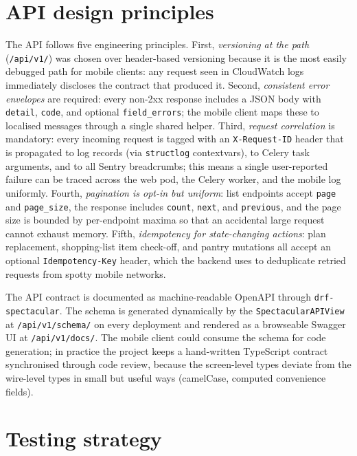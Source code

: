 \section{API design principles}

The API follows five engineering principles. First, \emph{versioning at the path} (\texttt{/api/v1/}) was chosen over header-based versioning because it is the most easily debugged path for mobile clients: any request seen in CloudWatch logs immediately discloses the contract that produced it. Second, \emph{consistent error envelopes} are required: every non-2xx response includes a JSON body with \texttt{detail}, \texttt{code}, and optional \texttt{field\_errors}; the mobile client maps these to localised messages through a single shared helper. Third, \emph{request correlation} is mandatory: every incoming request is tagged with an \texttt{X-Request-ID} header that is propagated to log records (via \texttt{structlog} contextvars), to Celery task arguments, and to all Sentry breadcrumbs; this means a single user-reported failure can be traced across the web pod, the Celery worker, and the mobile log uniformly. Fourth, \emph{pagination is opt-in but uniform}: list endpoints accept \texttt{page} and \texttt{page\_size}, the response includes \texttt{count}, \texttt{next}, and \texttt{previous}, and the page size is bounded by per-endpoint maxima so that an accidental large request cannot exhaust memory. Fifth, \emph{idempotency for state-changing actions}: plan replacement, shopping-list item check-off, and pantry mutations all accept an optional \texttt{Idempotency-Key} header, which the backend uses to deduplicate retried requests from spotty mobile networks.

The API contract is documented as machine-readable OpenAPI through \texttt{drf-spectacular}. The schema is generated dynamically by the \texttt{SpectacularAPIView} at \texttt{/api/v1/schema/} on every deployment and rendered as a browseable Swagger UI at \texttt{/api/v1/docs/}. The mobile client could consume the schema for code generation; in practice the project keeps a hand-written TypeScript contract synchronised through code review, because the screen-level types deviate from the wire-level types in small but useful ways (camelCase, computed convenience fields).

\section{Testing strategy}


